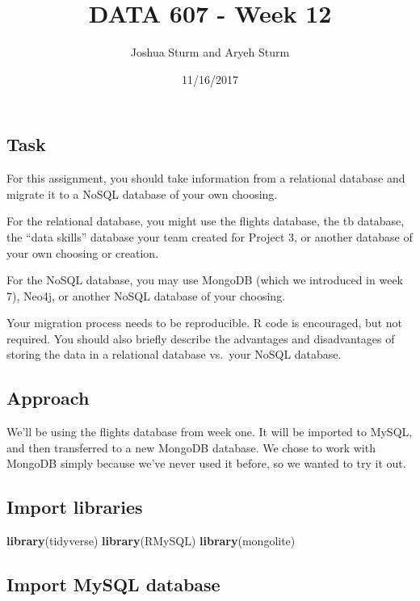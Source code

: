 \documentclass[]{article}
\title{DATA 607 - Week 12}
\author{Joshua Sturm and Aryeh Sturm}
\date{11/16/2017}
\newenvironment{Shaded}{\begin{snugshade}}{\end{snugshade}}
\newcommand{\KeywordTok}[1]{\textcolor[rgb]{0.13,0.29,0.53}{\textbf{#1}}}
\newcommand{\NormalTok}[1]{#1}
\begin{document}
\maketitle

\subsection{Task}\label{task}

For this assignment, you should take information from a relational
database and migrate it to a NoSQL database of your own choosing.

For the relational database, you might use the flights database, the tb
database, the ``data skills'' database your team created for Project 3,
or another database of your own choosing or creation.

For the NoSQL database, you may use MongoDB (which we introduced in week
7), Neo4j, or another NoSQL database of your choosing.

Your migration process needs to be reproducible. R code is encouraged,
but not required. You should also briefly describe the advantages and
disadvantages of storing the data in a relational database vs.~your
NoSQL database.

\subsection{Approach}\label{approach}

We'll be using the flights database from week one. It will be imported
to MySQL, and then transferred to a new MongoDB database. We chose to
work with MongoDB simply because we've never used it before, so we
wanted to try it out.

\subsection{Import libraries}\label{import-libraries}

\begin{Shaded}
\begin{Highlighting}[]
\KeywordTok{library}\NormalTok{(tidyverse)}
\KeywordTok{library}\NormalTok{(RMySQL)}
\KeywordTok{library}\NormalTok{(mongolite)}
\end{Highlighting}
\end{Shaded}

\subsection{Import MySQL database}\label{import-mysql-database}
\end{document}

